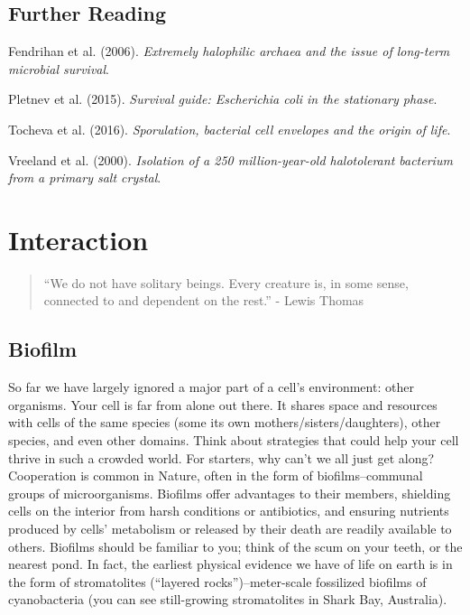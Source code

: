 \documentclass[]{tufte-book}
\begin{document}
\section{Further Reading}\label{further-reading}

Fendrihan et al. (2006). \emph{Extremely halophilic archaea and the
issue of long-term microbial survival}.\citep{fendrihan2006}

Pletnev et al. (2015). \emph{Survival guide: Escherichia coli in the
stationary phase}.\citep{pletnev2015}

Tocheva et al. (2016). \emph{Sporulation, bacterial cell envelopes and
the origin of life}.\citep{tocheva2016}

Vreeland et al. (2000). \emph{Isolation of a 250 million-year-old
halotolerant bacterium from a primary salt crystal}.\citep{vreeland2000}

\chapter{Interaction}\label{interaction}

\begin{quote}
``We do not have solitary beings. Every creature is, in some sense,
connected to and dependent on the rest.'' - Lewis Thomas
\citep{thomas1974}
\end{quote}

\section{Biofilm}\label{biofilm}

So far we have largely ignored a major part of a cell's environment:
other organisms. Your cell is far from alone out there. It shares space
and resources with cells of the same species (some its own
mothers/sisters/daughters), other species, and even other domains. Think
about strategies that could help your cell thrive in such a crowded
world. For starters, why can't we all just get along? Cooperation is
common in Nature, often in the form of biofilms--communal groups of
microorganisms. Biofilms offer advantages to their members, shielding
cells on the interior from harsh conditions or antibiotics, and ensuring
nutrients produced by cells' metabolism or released by their death are
readily available to others. Biofilms should be familiar to you; think
of the scum on your teeth, or the nearest pond. In fact, the earliest
physical evidence we have of life on earth is in the form of
stromatolites (``layered rocks'')--meter-scale fossilized biofilms of
cyanobacteria (you can see still-growing stromatolites in Shark Bay,
Australia).
\end{document}
